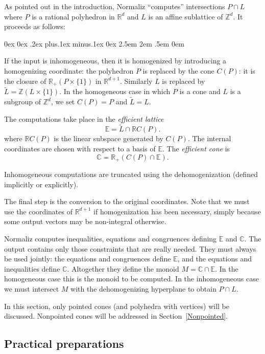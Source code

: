\documentclass[12pt,a4paper]{scrartcl}
\newcounter{listi}
\newcommand{\stdli}{ \topsep0ex \partopsep0ex %
\parsep.2ex plus.1ex minus.1ex \itemsep0ex%
\leftmargin2.5em \labelwidth2em \labelsep.5em \rightmargin0em}%
\newenvironment{arab}{\begin{list}{\textup{(\arabic{listi})}}%
	{\usecounter{listi}\stdli}}{\end{list}}
\theoremstyle{definition}
\def\CC{{\mathbb C}}
\def\ZZ{{\mathbb Z}}
\def\RR{{\mathbb R}}
\def\EE{{\mathbb E}}
\begin{document}
As pointed out in the introduction, Normaliz ``computes'' intersections $P\cap L$ where $P$ is a rational polyhedron in $\RR^d$ and $L$ is an affine sublattice of $\ZZ^d$. It proceeds as follows:

\begin{arab}
	\item If the input is inhomogeneous, then it is homogenized by introducing a homogenizing coordinate: the polyhedron $P$ is replaced by the cone $C(P)$: it is the closure of $\RR_+(P\times \{1\})$ in $\RR^{d+1}$. Similarly $L$ is replaced by $\widetilde L=\ZZ(L\times \{1\})$. In the homogeneous case in which $P$ is a cone and $L$ is a subgroup of $\ZZ^d$, we set $C(P)=P$ and $\widetilde L=L$.
	
	\item The computations take place in the \emph{efficient lattice}
	$$
	\EE=\widetilde{L}\cap \RR C(P).
	$$
	where $\RR C(P)$ is the linear subspace generated by $C(P)$. The internal coordinates are chosen with respect to a basis of $\EE$. The \emph{efficient cone} is
	$$
	\CC=\RR_+(C(P)\cap \EE).
	$$
	
	\item Inhomogeneous computations are truncated using the dehomogenization (defined implicitly or explicitly).
	
	\item The final step is the conversion to the original coordinates. Note that we must use the coordinates of $\RR^{d+1}$ if homogenization has been necessary, simply because some output vectors may be non-integral otherwise.
\end{arab}

Normaliz computes inequalities, equations and congruences defining $\EE$ and $\CC$. The output contains only those constraints that are really needed. They must always be used jointly: the equations and congruences define $\EE$, and the equations and inequalities define $\CC$. Altogether they define the monoid $M=\CC\cap\EE$. In the homogeneous case this is the monoid to be computed. In the inhomogeneous case we must intersect $M$ with the dehomogenizing hyperplane to obtain $P\cap L$.

In this section, only pointed cones (and polyhedra with vertices) will be discussed. Nonpointed cones will be addressed in Section~\ref{Nonpointed}.


\subsection{Practical preparations}
\end{document}
